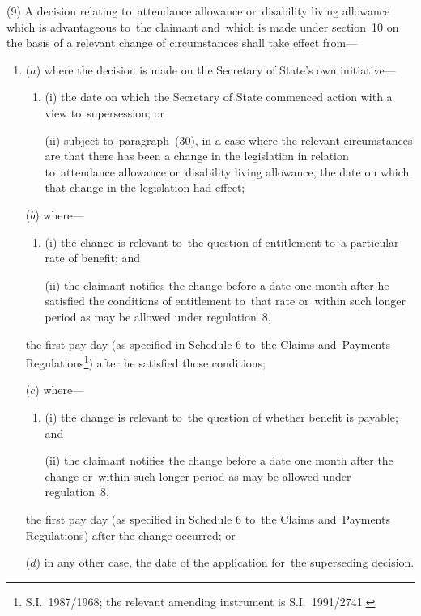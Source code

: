 \documentclass[12pt,a4paper]{article}
\begin{document}
(9) A decision relating to~attendance allowance or~disability living allowance which is advantageous to~the claimant and~which is made under section~10 on the basis of a relevant change of circumstances shall take effect from—
\begin{enumerate}\item[]

($a$) where the decision is made on the Secretary of State’s own initiative—
\begin{enumerate}\item[]
(i) the date on which the Secretary of State commenced action with a view to~supersession; or

(ii) subject to~paragraph~(30), in a case where the relevant circumstances are that there has been a change in the legislation in relation to~attendance allowance or~disability living allowance, the date on which that change in the legislation had effect;
\end{enumerate}

($b$) where—
\begin{enumerate}\item[]
(i) the change is relevant to~the question of entitlement to~a particular rate of benefit; and

(ii) the claimant notifies the change before a date one month after he satisfied the conditions of entitlement to~that rate or~within such longer period as may be allowed under regulation~8,
\end{enumerate}
the first pay day (as specified in Schedule 6 to~the Claims and~Payments Regulations\footnote{\frenchspacing S.I.~1987/1968; the relevant amending instrument is S.I.~1991/2741.}) after he satisfied those conditions;

($c$) where—
\begin{enumerate}\item[]
(i) the change is relevant to~the question of whether benefit is payable; and

(ii) the claimant notifies the change before a date one month after the change or~within such longer period as may be allowed under regulation~8,
\end{enumerate}
the first pay day (as specified in Schedule 6 to~the Claims and~Payments Regulations) after the change occurred; or

($d$) in any other case, the date of the application for~the superseding decision.
\end{enumerate}
\end{document}
